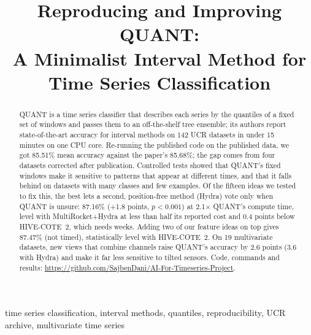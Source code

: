 \documentclass[conference]{IEEEtran}
\begin{document}
\title{Reproducing and Improving QUANT:\\ A Minimalist Interval Method for Time Series Classification}

\author{
\and
{}
}

\maketitle

\begin{abstract}
QUANT is a time series classifier that describes each series by the quantiles of a fixed set of windows and passes them to an off-the-shelf tree ensemble; its authors report state-of-the-art accuracy for interval methods on 142 UCR datasets in under 15 minutes on one CPU core. Re-running the published code on the published data, we got 85.51\% mean accuracy against the paper's 85.68\%; the gap comes from four datasets corrected after publication. Controlled tests showed that QUANT's fixed windows make it sensitive to patterns that appear at different times, and that it falls behind on datasets with many classes and few examples. Of the fifteen ideas we tested to fix this, the best lets a second, position-free method (Hydra) vote only when QUANT is unsure: 87.16\% (+1.8 points, $p<0.001$) at 2.1$\times$ QUANT's compute time, level with MultiRocket+Hydra at less than half its reported cost and 0.4 points below HIVE-COTE~2, which needs weeks. Adding two of our feature ideas on top gives 87.47\% (not timed), statistically level with HIVE-COTE~2. On 19 multivariate datasets, new views that combine channels raise QUANT's accuracy by 2.6 points (3.6 with Hydra) and make it far less sensitive to tilted sensors. Code, commands and results: \url{https://github.com/SajbenDani/AI-For-Timeseries-Project}.
\end{abstract}

\begin{IEEEkeywords}
time series classification, interval methods, quantiles, reproducibility, UCR archive, multivariate time series
\end{IEEEkeywords}
\end{document}
